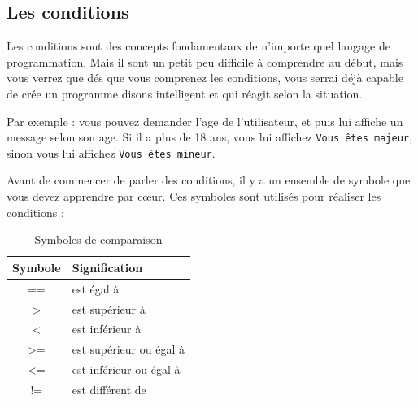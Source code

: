 \documentclass[12pt]{article}
\newcommand{\code}[1]{\colorbox{light-gray}{\texttt{#1}}}
\begin{document}
\clearpage

    \subsection{Les conditions}
        Les conditions sont des concepts fondamentaux de n'importe quel langage de programmation. Mais il sont un petit 
        peu difficile à comprendre au début, mais vous verrez que dés que vous comprenez les conditions, vous serrai 
        déjà capable de crée un programme disons intelligent et qui réagit selon la situation. 

        Par exemple : vous pouvez demander l'age de l'utilisateur, et puis lui affiche un message selon son age. Si il a 
        plus de 18 ans, vous lui affichez \code{Vous êtes majeur}, sinon vous lui affichez \code{Vous êtes mineur}.

        Avant de commencer de parler des conditions, il y a un ensemble de symbole que vous devez apprendre par cœur.
        Ces symboles sont utilisés pour réaliser les conditions :

        \begin{table}[h] %

            \centering
            \begin{tabular}{|c|l|}
            \hline
            \textbf{Symbole} & \textbf{Signification} \\
            \hline
            == & est égal à \\
            \hline
            > & est supérieur à \\
            \hline
            < & est inférieur à \\
            \hline
            >= & est supérieur ou égal à \\
            \hline
            <= & est inférieur ou égal à \\
            \hline
            != & est différent de \\
            \hline
            \end{tabular}

            \caption{Symboles de comparaison} %
        \end{table}
\end{document}
